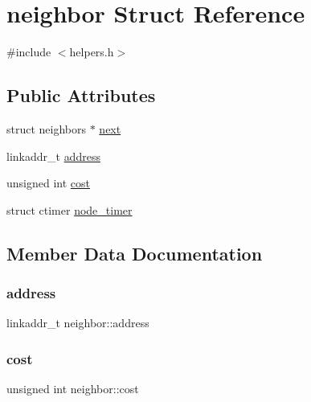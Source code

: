 \hypertarget{structneighbor}{}\section{neighbor Struct Reference}
\label{structneighbor}


{\ttfamily \#include $<$helpers.\+h$>$}

\subsection*{Public Attributes}
\begin{DoxyCompactItemize}
\item 
struct neighbors $\ast$ \hyperlink{structneighbor_af8be86eeccbf24edc4a2f83681d95c99}{next}
\item 
linkaddr\+\_\+t \hyperlink{structneighbor_a187334f3fa51c2e018f405aba4fe6e48}{address}
\item 
unsigned int \hyperlink{structneighbor_a7111de058673c7b2b19dd96b71984aa2}{cost}
\item 
struct ctimer \hyperlink{structneighbor_a64f8c520a732dbb0b958c7d715689f4f}{node\+\_\+timer}
\end{DoxyCompactItemize}


\subsection{Member Data Documentation}
\mbox{\label{structneighbor_a187334f3fa51c2e018f405aba4fe6e48}} 
\subsubsection{\texorpdfstring{address}{address}}
{\footnotesize\ttfamily linkaddr\+\_\+t neighbor\+::address}

\mbox{\label{structneighbor_a7111de058673c7b2b19dd96b71984aa2}} 
\subsubsection{\texorpdfstring{cost}{cost}}
{\footnotesize\ttfamily unsigned int neighbor\+::cost}

\mbox{\label{structneighbor_af8be86eeccbf24edc4a2f83681d95c99}} 
